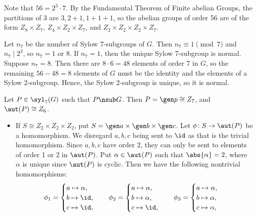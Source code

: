 \begin{solenum}
    \item Note that $56 = 2^3 \cdot 7$.
	By the Fundamental Theorem of Finite abelian Groups, the partitions of 3 are $3, 2 + 1, 1 + 1 + 1$, so the abelian groups of order 56 are of the form $Z_8 \times Z_7$, $Z_4 \times Z_2 \times Z_7$, and $Z_2 \times Z_2 \times Z_2 \times Z_7$.
    \item Let $n_7$ be the number of Sylow 7-subgroups of $G$.
	Then $n_7 \equiv 1 \pmod 7$ and $n_7 \mid 2^3$, so $n_7 = 1$ or $8$.
	If $n_7 = 1$, then the unique Sylow 7-subgroup is normal.
	Suppose $n_7 = 8$.
	Then there are $8 \cdot 6 = 48$ elements of order 7 in $G$, so the remaining $56 - 48 = 8$ elements of $G$ must be the identity and the elements of a Sylow 2-subgroup.
	Hence, the Sylow 2-subgroup is unique, so it is normal.
    \item Let $P \in \syl_7(G)$ such that $P \nsub G$.
	Then $P = \gen p \cong Z_7$, and $\aut(P) \cong Z_6$.
    \begin{itemize}
        \item If $S \cong Z_2 \times Z_2 \times Z_2$, put $S = \gen a \times \gen b \times \gen c$.
        Let $\phi \colon S \to \aut(P)$ be a homomorphism.
        We disregard $a, b, c$ being sent to $\id$ as that is the trivial homomorphism.
        Since $a, b, c$ have order 2, they can only be sent to elements of order 1 or 2 in $\aut(P)$.
        Put $\alpha \in \aut(P)$ such that $\abs{\alpha} = 2$, where $\alpha$ is unique since $\aut(P)$ is cyclic.
        Then we have the following nontrivial homomorphisms:
        \[
        	\phi_1 = 
            \begin{cases}
                a \mapsto \alpha, \\
                b \mapsto \id, \\
                c \mapsto \id,
            \end{cases} \quad
            \phi_2 =
            \begin{cases}
                a \mapsto \alpha, \\
                b \mapsto \alpha, \\
                c \mapsto \id,
            \end{cases} \quad
            \phi_3 =
            \begin{cases}
                a \mapsto \alpha, \\
                b \mapsto \alpha, \\
                c \mapsto \alpha,
            \end{cases}
\]
\end{itemize}
\end{solenum}

